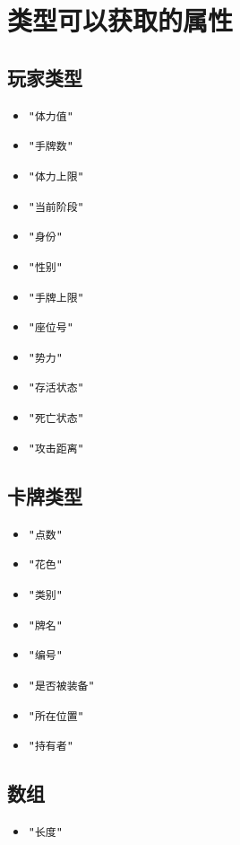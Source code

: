 \chapter{类型可以获取的属性}

\section{玩家类型}

\begin{itemize}
 \item \verb|"体力值"|
 \item \verb|"手牌数"|
 \item \verb|"体力上限"|
 \item \verb|"当前阶段"|
 \item \verb|"身份"|
 \item \verb|"性别"|
 \item \verb|"手牌上限"|
 \item \verb|"座位号"|
 \item \verb|"势力"|
 \item \verb|"存活状态"|
 \item \verb|"死亡状态"|
 \item \verb|"攻击距离"|
\end{itemize}

\section{卡牌类型}

\begin{itemize}
 \item \verb|"点数"|
 \item \verb|"花色"|
 \item \verb|"类别"|
 \item \verb|"牌名"|
 \item \verb|"编号"|
 \item \verb|"是否被装备"|
 \item \verb|"所在位置"|
 \item \verb|"持有者"|
\end{itemize}

\section{数组}

\begin{itemize}
 \item \verb|"长度"|
\end{itemize}

